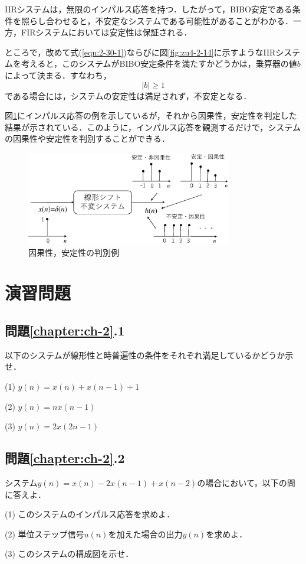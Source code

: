IIRシステムは，無限のインパルス応答を持つ．したがって，BIBO安定である条件を照らし合わせると，不安定なシステムである可能性があることがわかる．一方，FIRシステムにおいては安定性は保証される．

ところで，改めて式(\ref{eqn:2-30-1})ならびに図\ref{fig:zu4-2-14}に示すようなIIRシステムを考えると，このシステムがBIBO安定条件を満たすかどうかは，乗算器の値$b$によって決まる．すなわち，
\begin{equation}
|b|\geq 1
\end{equation}
である場合には，システムの安定性は満足されず，不安定となる．

図\ref{fig:zu4-2-17}にインパルス応答の例を示しているが，それから因果性，安定性を判定した結果が示されている．このように，インパルス応答を観測するだけで，システムの因果性や安定性を判別することができる．

\begin{figure}[H]
\begin{center}
\includegraphics[width=9cm]{fig/zu-2-17.eps}
\end{center}
\caption{因果性，安定性の判別例}
\label{fig:zu4-2-17}
\end{figure}

\section*{演習問題}

\subsection*{問題\ref{chapter:ch-2}.1}

以下のシステムが線形性と時普遍性の条件をそれぞれ満足しているかどうか示せ．

(1) $y(n)=x(n)+x(n-1)+1$

(2) $y(n)=nx(n-1)$

(3) $y(n)=2x(2n-1)$

\subsection*{問題\ref{chapter:ch-2}.2}

システム$y(n)=x(n)-2x(n-1)+x(n-2)$の場合において，以下の問に答えよ．

(1) このシステムのインパルス応答を求めよ．

(2) 単位ステップ信号$u(n)$を加えた場合の出力$y(n)$を求めよ．

(3) このシステムの構成図を示せ．






